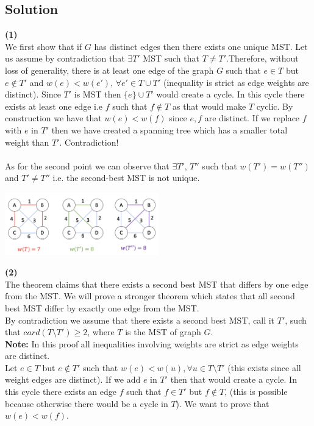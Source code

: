 \documentclass[10pt,a4paper]{article}
\begin{document}
\subsection*{Solution}
\textbf{(1)}\\ We first show that if $G$ has distinct edges then there exists one unique MST. Let us assume by contradiction that $\exists T'$ MST such that $T \neq T'$.Therefore, without loss of generality, there is at least one edge of the graph $G$ such that $e \in T$ but $e\not\in T'$ and  $w(e) < w(e'), \, \forall e' \in T \cup T'$ (inequality is strict as edge weights are distinct). Since $T'$ is MST then $\{e\} \cup T'$ would create a cycle. In this cycle there exists at least one edge i.e $f$ such that $f \not\in T$ as that would make $T$ cyclic. By construction we have that $w(e) < w(f)$ since $e,f$ are distinct. If we replace $f$ with $e$ in $T'$ then we have created a spanning tree which has a smaller total weight than $T'$. Contradiction!\\\\
As for the second point we can observe that $\exists T', \, T''$ such that $w(T') = w(T'')$ and $T' \neq T''$ i.e. the second-best MST is not unique.
\begin{center}
\includegraphics[width = 0.5\textwidth]{mst}
\end{center}
\textbf{(2)} \\
The theorem claims that there exists a second best MST that differs by one edge from the MST. We will prove a stronger theorem which states that all second best MST differ by exactly one edge from the MST. \\ 
By contradiction we assume	that there exists a second best MST, call it $T'$, such that $card (T \setminus T') \geq 2$, where $T$ is the MST of graph $G$.\\
\textbf{Note:} In this proof all inequalities involving weights are strict as edge weights are distinct.\\

Let $e \in T$ but $e \not\in T'$ such that $w(e) < w(u), \forall u \in T \setminus T'$ (this exists since all weight edges are distinct). If we add $e$ in $T'$ then that would create a cycle. In this cycle there exists an edge $f$ such that $f \in T'$ but $f \not\in T$, (this is possible because otherwise there would be a cycle in $T$). We want to prove that $w(e) < w(f)$. \\
\end{document}
